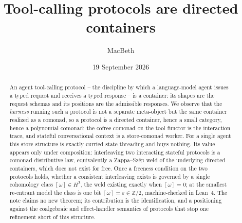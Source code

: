 \documentclass[11pt]{amsart}
\title[Tool-calling protocols are directed containers]{Tool-calling protocols are directed containers}
\author{MacBeth}
\date{19 September 2026}
\theoremstyle{plain}
\theoremstyle{definition}
\theoremstyle{remark}
\begin{document}
\begin{abstract}
An agent tool-calling protocol -- the discipline by which a language-model agent issues a typed
request and receives a typed response -- is a container: its shapes are the request schemas and its
positions are the admissible responses. We observe that the \emph{harness} running such a protocol
is not a separate meta-object but the same container realized as a comonad, so a protocol is a
directed container, hence a small category, hence a polynomial comonad; the cofree comonad on the
tool functor is the interaction trace, and stateful conversational context is a store-comonad
worker. For a single agent this store structure is exactly curried state-threading and buys nothing.
Its value appears only under composition: interleaving two interacting stateful protocols is a
comonad distributive law, equivalently a Zappa--Sz\'ep weld of the underlying directed containers,
which does not exist for free. Once a freeness condition on the two protocols holds, whether a
consistent interleaving exists is governed by a single cohomology class $[\omega]\in H^2$, the weld
existing exactly when $[\omega]=0$; at the smallest re-entrant model the class is one bit
$[\omega]=\varepsilon\in\mathbb{Z}/2$, machine-checked in Lean~4. The note claims no new theorem; its contribution is the identification, and a positioning
against the coalgebraic and effect-handler semantics of protocols that stop one refinement short of
this structure.
\end{abstract}

\maketitle

\begingroup\small
\noindent{}
\endgroup

\bigskip
\end{document}

